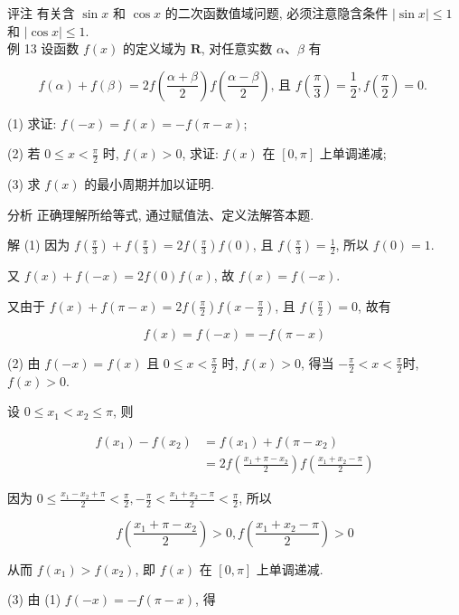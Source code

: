 	评注 有关含 $\sin x$ 和 $\cos x$ 的二次函数值域问题, 必须注意隐含条件 $|\sin x| \leqslant 1$ 和 $|\cos x| \leqslant 1$.\\
	例 13 设函数 $f(x)$ 的定义域为 $\mathbf{R}$, 对任意实数 $\alpha 、 \beta$ 有

	$$
		f(\alpha)+f(\beta)=2 f\left(\frac{\alpha+\beta}{2}\right) f\left(\frac{\alpha-\beta}{2}\right) \text {, 且 } f\left(\frac{\pi}{3}\right)=\frac{1}{2}, f\left(\frac{\pi}{2}\right)=0 \text {. }
	$$

	(1) 求证: $f(-x)=f(x)=-f(\pi-x)$;

	(2) 若 $0 \leqslant x<\frac{\pi}{2}$ 时, $f(x)>0$, 求证: $f(x)$ 在 $[0, \pi]$ 上单调递减;

	(3) 求 $f(x)$ 的最小周期并加以证明.

	分析 正确理解所给等式, 通过赋值法、定义法解答本题.

	解 (1) 因为 $f\left(\frac{\pi}{3}\right)+f\left(\frac{\pi}{3}\right)=2 f\left(\frac{\pi}{3}\right) f(0)$, 且 $f\left(\frac{\pi}{3}\right)=\frac{1}{2}$, 所以 $f(0)=1$.

	又 $f(x)+f(-x)=2 f(0) f(x)$, 故 $f(x)=f(-x)$.

	又由于 $f(x)+f(\pi-x)=2 f\left(\frac{\pi}{2}\right) f\left(x-\frac{\pi}{2}\right)$, 且 $f\left(\frac{\pi}{2}\right)=0$, 故有

	$$
		f(x)=f(-x)=-f(\pi-x)
	$$

	(2) 由 $f(-x)=f(x)$ 且 $0 \leqslant x<\frac{\pi}{2}$ 时, $f(x)>0$, 得当 $-\frac{\pi}{2}<x<\frac{\pi}{2}$时, $f(x)>0$.

	设 $0 \leqslant x_{1}<x_{2} \leqslant \pi$, 则

	$$
		\begin{aligned}
			f\left(x_{1}\right)-f\left(x_{2}\right) & =f\left(x_{1}\right)+f\left(\pi-x_{2}\right)                                       \\
			                                        & =2 f\left(\frac{x_{1}+\pi-x_{2}}{2}\right) f\left(\frac{x_{1}+x_{2}-\pi}{2}\right)
		\end{aligned}
	$$

	因为 $0 \leqslant \frac{x_{1}-x_{2}+\pi}{2}<\frac{\pi}{2},-\frac{\pi}{2}<\frac{x_{1}+x_{2}-\pi}{2}<\frac{\pi}{2}$, 所以

	$$
		f\left(\frac{x_{1}+\pi-x_{2}}{2}\right)>0, f\left(\frac{x_{1}+x_{2}-\pi}{2}\right)>0
	$$

	从而 $f\left(x_{1}\right)>f\left(x_{2}\right)$, 即 $f(x)$ 在 $[0, \pi]$ 上单调递减.

	(3) 由 (1) $f(-x)=-f(\pi-x)$, 得

